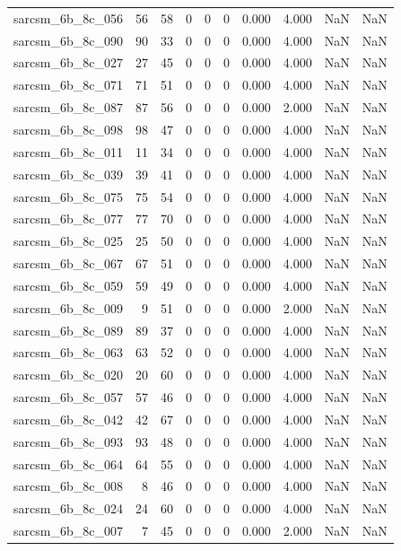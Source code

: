 \documentclass{article}
\begin{document}
\begin{longtable}{lrrrrrrrrr}
sarcsm\_6b\_8c\_056 & 56 & 58 & 0 & 0 & 0 & 0.000 & 4.000 & NaN & NaN \\
sarcsm\_6b\_8c\_090 & 90 & 33 & 0 & 0 & 0 & 0.000 & 4.000 & NaN & NaN \\
sarcsm\_6b\_8c\_027 & 27 & 45 & 0 & 0 & 0 & 0.000 & 4.000 & NaN & NaN \\
sarcsm\_6b\_8c\_071 & 71 & 51 & 0 & 0 & 0 & 0.000 & 4.000 & NaN & NaN \\
sarcsm\_6b\_8c\_087 & 87 & 56 & 0 & 0 & 0 & 0.000 & 2.000 & NaN & NaN \\
sarcsm\_6b\_8c\_098 & 98 & 47 & 0 & 0 & 0 & 0.000 & 4.000 & NaN & NaN \\
sarcsm\_6b\_8c\_011 & 11 & 34 & 0 & 0 & 0 & 0.000 & 4.000 & NaN & NaN \\
sarcsm\_6b\_8c\_039 & 39 & 41 & 0 & 0 & 0 & 0.000 & 4.000 & NaN & NaN \\
sarcsm\_6b\_8c\_075 & 75 & 54 & 0 & 0 & 0 & 0.000 & 4.000 & NaN & NaN \\
sarcsm\_6b\_8c\_077 & 77 & 70 & 0 & 0 & 0 & 0.000 & 4.000 & NaN & NaN \\
sarcsm\_6b\_8c\_025 & 25 & 50 & 0 & 0 & 0 & 0.000 & 4.000 & NaN & NaN \\
sarcsm\_6b\_8c\_067 & 67 & 51 & 0 & 0 & 0 & 0.000 & 4.000 & NaN & NaN \\
sarcsm\_6b\_8c\_059 & 59 & 49 & 0 & 0 & 0 & 0.000 & 4.000 & NaN & NaN \\
sarcsm\_6b\_8c\_009 & 9 & 51 & 0 & 0 & 0 & 0.000 & 2.000 & NaN & NaN \\
sarcsm\_6b\_8c\_089 & 89 & 37 & 0 & 0 & 0 & 0.000 & 4.000 & NaN & NaN \\
sarcsm\_6b\_8c\_063 & 63 & 52 & 0 & 0 & 0 & 0.000 & 4.000 & NaN & NaN \\
sarcsm\_6b\_8c\_020 & 20 & 60 & 0 & 0 & 0 & 0.000 & 4.000 & NaN & NaN \\
sarcsm\_6b\_8c\_057 & 57 & 46 & 0 & 0 & 0 & 0.000 & 4.000 & NaN & NaN \\
sarcsm\_6b\_8c\_042 & 42 & 67 & 0 & 0 & 0 & 0.000 & 4.000 & NaN & NaN \\
sarcsm\_6b\_8c\_093 & 93 & 48 & 0 & 0 & 0 & 0.000 & 4.000 & NaN & NaN \\
sarcsm\_6b\_8c\_064 & 64 & 55 & 0 & 0 & 0 & 0.000 & 4.000 & NaN & NaN \\
sarcsm\_6b\_8c\_008 & 8 & 46 & 0 & 0 & 0 & 0.000 & 4.000 & NaN & NaN \\
sarcsm\_6b\_8c\_024 & 24 & 60 & 0 & 0 & 0 & 0.000 & 4.000 & NaN & NaN \\
sarcsm\_6b\_8c\_007 & 7 & 45 & 0 & 0 & 0 & 0.000 & 2.000 & NaN & NaN \\

\end{longtable}
\end{document}
